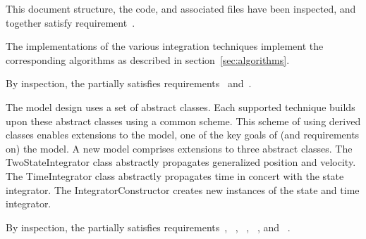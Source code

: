 \label{inspect:TLI}
This document structure, the code, and associated files have been inspected, 
and together satisfy requirement~.


\label{inspect:math}
The implementations of the various integration techniques
implement the corresponding algorithms as described in
section~\ref{sec:algorithms}.

By inspection, the \ModelDesc partially satisfies
requirements~
and~.


\label{inspect:design}
The model design uses a set of abstract classes. Each supported technique 
builds
upon these abstract classes using a common scheme.  This scheme of using
derived classes enables extensions to the model, one of the key goals of (and
requirements on) the model. A new model comprises extensions to three abstract 
classes. The TwoStateIntegrator class abstractly propagates generalized
position and velocity. The TimeIntegrator class abstractly propagates time
in concert with the state integrator. The IntegratorConstructor creates
new instances of the state and time integrator.

By inspection, the \ModelDesc partially satisfies
requirements~,
~, 
~,
~,
and ~.

